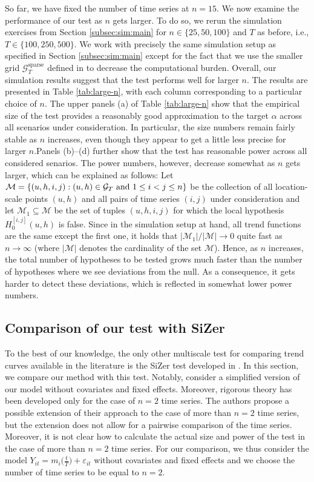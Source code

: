 \documentclass[12pt]{article}
\makeatletter
\renewcommand{\eqref}[1]{\tagform@{\ref{#1}}}
\makeatother
\begin{document}
So far, we have fixed the number of time series at $n = 15$. We now examine the performance of our test as $n$ gets larger. To do so, we rerun the simulation exercises from Section \ref{subsec:sim:main} for $n \in \{25,50,100\}$ and $T$ as before, i.e., $T \in \{100,250,500\}$. We work with precisely the same simulation setup as specified in Section \ref{subsec:sim:main} except for the fact that we use the smaller grid $\mathcal{G}_T^{\text{sparse}}$ defined in \eqref{eq:grid-sparse} to decrease the computational burden. Overall, our simulation results suggest that the test performs well for larger $n$. The results are presented in Table \ref{tab:large-n}, with each column corresponding to a particular choice of $n$. The upper panels (a) of Table \ref{tab:large-n} show that the empirical size of the test provides a reasonably good approximation to the target $\alpha$ across all scenarios under consideration. In particular, the size numbers remain fairly stable as $n$ increases, even though they appear to get a little less precise for larger $n$.Panels (b)--(d) further show that the test has reasonable power across all considered senarios. The power numbers, however, decrease somewhat as $n$ gets larger, which can be explained as follows: Let $\mathcal{M} = \{ (u,h,i,j): (u,h) \in \mathcal{G}_T \text{ and } 1 \le i < j \le n \}$ be the collection of all location-scale points $(u,h)$ and all pairs of time series $(i,j)$ under consideration and let $\mathcal{M}_1 \subseteq \mathcal{M}$ be the set of tuples $(u,h,i,j)$ for which the local hypothesis $H_0^{[i, j]}(u, h)$ is false. Since in the simulation setup at hand, all trend functions are the same except the first one, it holds that $|\mathcal{M}_1| / |\mathcal{M}| \to 0$ quite fast as $n \to \infty$ (where $| \mathcal{M} |$ denotes the cardinality of the set $\mathcal{M}$). Hence, as $n$ increases, the total number of hypotheses to be tested grows much faster than the number of hypotheses where we see deviations from the null. As a consequence, it gets harder to detect these deviations, which is reflected in somewhat lower power numbers. 


\subsection{Comparison of our test with SiZer} 


To the best of our knowledge, the only other multiscale test for comparing trend curves available in the literature is the SiZer test developed in \cite{Park2009}. In this section, we compare our method with this test. Notably, \cite{Park2009} consider a simplified version of our model without covariates and fixed effects. Moreover, rigorous theory has been developed only for the case of $n=2$ time series. The authors propose a possible extension of their approach to the case of more than $n=2$ time series, but the extension does not allow for a pairwise comparison of the time series. Moreover, it is not clear how to calculate the actual size and power of the test in the case of more than $n=2$ time series. For our comparison, we thus consider the model $Y_{it} = m_i\big(\frac{t}{T}\big) + \varepsilon_{it}$ without covariates and fixed effects and we choose the number of time series to be equal to $n=2$. 
\end{document}
